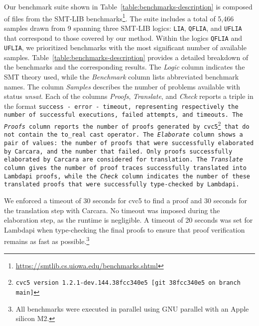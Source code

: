 Our benchmark suite shown in Table~\ref{table:benchmarks-description} is composed of files from the SMT-LIB benchmarks\footnote{\url{https://smtlib.cs.uiowa.edu/benchmarks.shtml}}.
The suite includes a total of 5,466 samples drawn from 9  spanning three SMT-LIB logics: \texttt{LIA}, \texttt{QFLIA}, and \texttt{UFLIA} that correspond to those covered by our method.
Within the logics \texttt{QFLIA} and \texttt{UFLIA}, we prioritized benchmarks with the most significant number of available samples.
Table~\ref{table:benchmarks-description}
provides a detailed breakdown of the benchmarks and the corresponding results.
The \emph{Logic} column indicates the SMT theory used, while the \emph{Benchmark} column lists abbreviated benchmark names.
The column \emph{Samples} describes the number of problems available with status \emph{unsat}. 
Each of the columns \emph{Proofs}, \emph{Translate}, and \emph{Check} reports a triple in the format \tt{success - error - timeout}, representing respectively the number of successful executions, failed attempts, and timeouts. 
The \emph{Proofs} column reports the number of proofs generated by cvc5\footnote{cvc5 version 1.2.1-dev.144.38fcc340e5 [git 38fcc340e5 on branch main]} that do not contain the \lstinline[language=SMT,basicstyle=\ttfamily\footnotesize]|to_real| cast operator.
The \emph{Elaborate} column shows a pair of values: the number of proofs that were successfully elaborated by Carcara, and the number that failed. Only proofs successfully elaborated by Carcara are considered for translation.
The \emph{Translate} column gives the number of proof traces successfully translated into Lambdapi proofs, while the \emph{Check} column indicates the number of these translated proofs that were successfully type-checked by Lambdapi. 

We enforced a timeout of 30 seconds for cvc5 to find a proof and 30 seconds for the translation step with Carcara.
No timeout was imposed during the elaboration step, as the runtime is negligible.
A timeout of 20 seconds was set for Lambdapi when type-checking the final proofs to ensure that proof verification remains as fast as possible.\footnote{All benchmarks were executed in parallel using GNU parallel \cite{tange_2025_15071920} with an Apple silicon M2.} %

